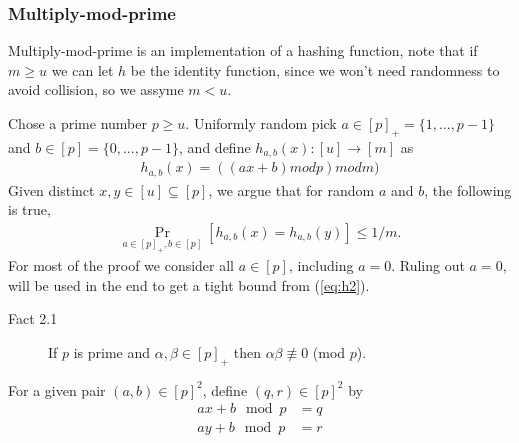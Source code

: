 \subsubsection{Multiply-mod-prime}
Multiply-mod-prime is an implementation of a hashing function, note that if $m
\geq u$ we can let $h$ be the identity function, since we won't need randomness
to avoid collision, so we assyme $m < u$.

Chose a prime number $p \geq u$. Uniformly random pick $a \in [p]_+ = \{1, ...,
p-1\}$ and $b \in [p] = \{ 0, ..., p-1\}$, and define $h_{a,b}(x) : [u]
\rightarrow [m]$ as
\begin{align}
  h_{a,b}(x) = ((ax+b) mod p) mod m) \label{eq:h1}
\end{align}
Given distinct $x,y \in [u] \subseteq [p]$, we argue that for random $a$ and
$b$, the following is true,
\begin{align}
  \underset{a\in [p]_+,b\in [p]}{\Pr}[h_{a,b}(x) = h_{a,b}(y)] \leq
  1/m. \label{eq:h2}
\end{align}
For most of the proof we consider all $a \in [p]$, including $a=0$. Ruling out
$a=0$, will be used in the end to get a tight bound from (\ref{eq:h2}).

\begin{description}
\item[Fact 2.1] If $p$ is prime and $\alpha, \beta \in [p]_+$ then $\alpha \beta
  \not\equiv 0$ (mod $p$).
\end{description}

For a given pair $(a,b) \in [p]^2$, define $(q,r) \in [p]^2$ by
\begin{align}
  ax+b\mod p &= q \label{eq:h3} \\
  ay+b\mod p &= r \label{eq:h4}
\end{align}

